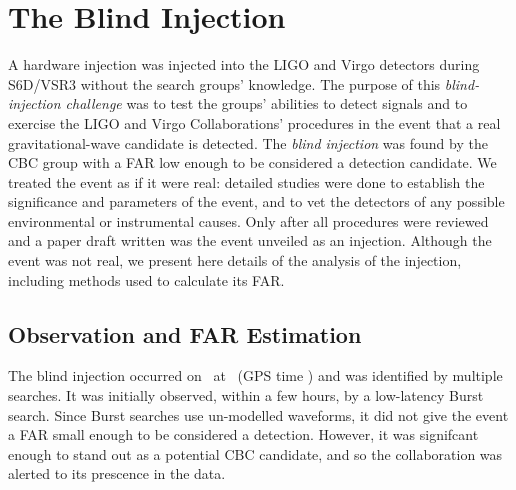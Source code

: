 
\section{The Blind Injection}

A hardware injection was injected into the \ac{LIGO} and Virgo detectors during
S6D/VSR3 without the search groups' knowledge. The purpose of this
\emph{blind-injection challenge} was to test the groups' abilities to detect
signals and to exercise the LIGO and Virgo Collaborations' procedures in the
event that a real gravitational-wave candidate is detected. The {\it blind
injection} was found by the \ac{CBC} group with a FAR low enough to be
considered a detection candidate. We treated the event as if it were real:
detailed studies were done to establish the significance and parameters of the
event, and to vet the detectors of any possible environmental or instrumental
causes. Only after all procedures were reviewed and a paper draft written was
the event unveiled as an injection.  Although the event was not real, we
present here details of the analysis of the injection, including methods used
to calculate its \ac{FAR}.

\subsection{Observation and FAR Estimation}

The blind injection occurred on \dogDate~at \injectedDogTime~(GPS time
\injectedDogGPSTime) and was identified by multiple searches. It was initially
observed, within a few hours, by a low-latency Burst search. Since Burst
searches use un-modelled waveforms, it did not give the event a \ac{FAR} small
enough to be considered a detection. However, it was signifcant enough to stand
out as a potential \ac{CBC} candidate, and so the collaboration was alerted to
its prescence in the data.

